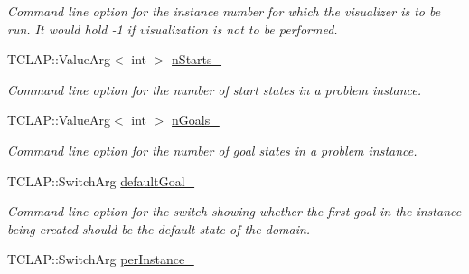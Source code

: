 \begin{DoxyCompactItemize}
\begin{DoxyCompactList}\small\item\em Command line option for the instance number for which the visualizer is to be run. It would hold -\/1 if visualization is not to be performed. \end{DoxyCompactList}\item 
T\+C\+L\+A\+P\+::\+Value\+Arg$<$ int $>$ \hyperlink{structslb_1_1core_1_1commandLine_1_1CommandLine_af848807b96ecf4560989abb9b78bfdf5}{n\+Starts\+\_\+}\hypertarget{structslb_1_1core_1_1commandLine_1_1CommandLine_af848807b96ecf4560989abb9b78bfdf5}{}\label{structslb_1_1core_1_1commandLine_1_1CommandLine_af848807b96ecf4560989abb9b78bfdf5}

\begin{DoxyCompactList}\small\item\em Command line option for the number of start states in a problem instance. \end{DoxyCompactList}\item 
T\+C\+L\+A\+P\+::\+Value\+Arg$<$ int $>$ \hyperlink{structslb_1_1core_1_1commandLine_1_1CommandLine_a68720f2ac1005479c84cc6cd681696e3}{n\+Goals\+\_\+}\hypertarget{structslb_1_1core_1_1commandLine_1_1CommandLine_a68720f2ac1005479c84cc6cd681696e3}{}\label{structslb_1_1core_1_1commandLine_1_1CommandLine_a68720f2ac1005479c84cc6cd681696e3}

\begin{DoxyCompactList}\small\item\em Command line option for the number of goal states in a problem instance. \end{DoxyCompactList}\item 
T\+C\+L\+A\+P\+::\+Switch\+Arg \hyperlink{structslb_1_1core_1_1commandLine_1_1CommandLine_a7157af3d110066e82e11493e93e37050}{default\+Goal\+\_\+}\hypertarget{structslb_1_1core_1_1commandLine_1_1CommandLine_a7157af3d110066e82e11493e93e37050}{}\label{structslb_1_1core_1_1commandLine_1_1CommandLine_a7157af3d110066e82e11493e93e37050}

\begin{DoxyCompactList}\small\item\em Command line option for the switch showing whether the first goal in the instance being created should be the default state of the domain. \end{DoxyCompactList}\item 
T\+C\+L\+A\+P\+::\+Switch\+Arg \hyperlink{structslb_1_1core_1_1commandLine_1_1CommandLine_a7f35a809f1c1b6ccbf080d2cb6109a22}{per\+Instance\+\_\+}\hypertarget{structslb_1_1core_1_1commandLine_1_1CommandLine_a7f35a809f1c1b6ccbf080d2cb6109a22}{}\label{structslb_1_1core_1_1commandLine_1_1CommandLine_a7f35a809f1c1b6ccbf080d2cb6109a22}


\end{DoxyCompactItemize}
